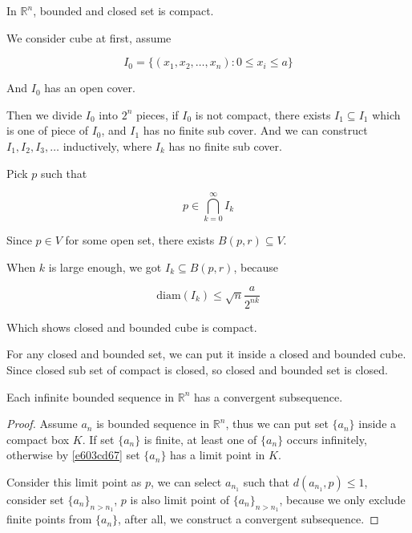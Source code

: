 \begin{thm}\label{heine-borel}
    In $\mathbb{R}^n$, bounded and closed set is compact. 

    We consider cube at first, assume 

    \[
        I_0 =  \{ (x_1,x_2,\dots, x_n):  0 \le x_i \le a\}
    \]

    And $I_0$ has an open cover.

    Then we divide $I_0$ into $2^n$ pieces, if $I_0$ is not compact, 
    there exists $I_1 \subseteq I_1$ which is one of piece of $I_0$, and 
    $I_1$ has no finite sub cover. And we can construct $I_1,I_2,I_3,\dots$ 
    inductively, where $I_k$ has no finite sub cover.

    Pick $p$ such that

    \[
        p \in \bigcap_{k=0}^{\infty}I_k
    \]

    Since $p \in V$ for some open set, there exists $B(p, r) \subseteq V$. 

    When $k$ is large enough, we got $I_k \subseteq B(p,r)$, because

    \[
        \mathrm{diam}(I_k) \le \sqrt{n} \frac{a}{2^{nk}}
    \]

    Which shows closed and bounded cube is compact.

    For any closed and bounded set, we can put it inside a closed and bounded cube.
    Since closed sub set of compact is closed, so closed and bounded set is closed.
\end{thm}


\begin{thm}\label{metric-space-bolzano-weierstrass}
    Each infinite bounded sequence in $\mathbb{R}^n$
 has a convergent subsequence. 
\end{thm}

\begin{proof}
    Assume $a_n$ is bounded sequence in $\mathbb{R}^n$, thus we can put set $\{ a_n \}$
    inside a compact box $K$. If set $ \{ a_n \} $ is finite, at least one of $\{ a_n \}$
    occurs infinitely, otherwise by \cref{e603cd67} set $\{ a_n \}$ has a limit point in $K$.

    Consider this limit point as $p$, we can select $a_{n_1}$ such that $d(a_{n_1}, p) \le 1$,
    consider set $\{ a_n \}_{n > n_1}$, $p$ is also limit point of $\{ a_n \}_{n > n_1}$, because 
    we only exclude finite points from $\{ a_n \}$, after all, we construct a convergent subsequence.
\end{proof}